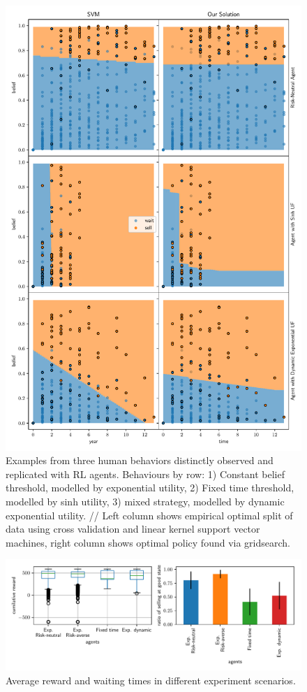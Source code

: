 
\begin{figure}
    \includegraphics[width=0.8\linewidth]{img/fit}
    \caption{Examples from three human behaviors distinctly observed and replicated with RL agents. Behaviours by row: 1) Constant belief threshold, modelled by exponential utility, 2) Fixed time threshold, modelled by sinh utility, 3) mixed strategy, modelled by dynamic exponential utility. // Left column shows empirical optimal split of data using cross validation and linear kernel support vector machines, right column shows optimal policy found via gridsearch.}
    \label{fig:svm_vs_value}
\end{figure}


\begin{figure}
\includegraphics[width=0.8\linewidth]{img/performance.pdf}
\caption{Average reward and waiting times in different experiment scenarios.}
\end{figure}
